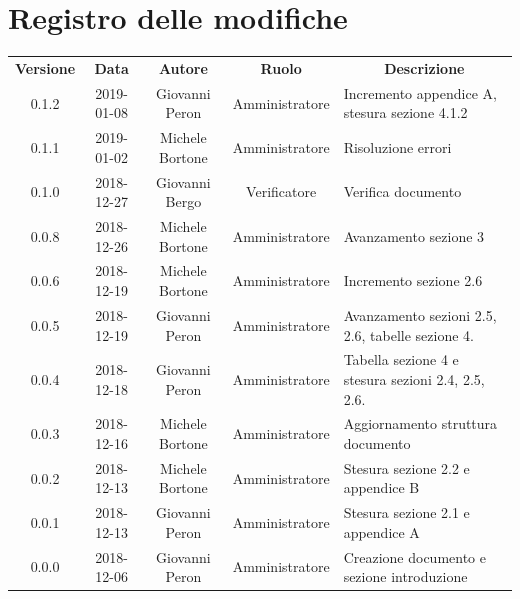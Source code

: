 \documentclass[11pt,a4paper]{article}
\begin{document}
	
	\newpage
	\section*{\centering Registro delle modifiche}
	\begin{tabularx}{\textwidth}{ c | c | c | c | X }
		\rowcolor{LightBlue}
		\color{white}\bfseries Versione & \color{white}\bfseries Data & \color{white}\bfseries Autore & \color{white}\bfseries Ruolo & \multicolumn{1}{c}{\color{white}\bfseries Descrizione}\\[0.25cm]
		0.1.2 & 2019-01-08 & Giovanni Peron & Amministratore & Incremento appendice A, stesura sezione 4.1.2\\ \hline
		0.1.1 & 2019-01-02 & Michele Bortone & Amministratore & Risoluzione errori\\ \hline
		0.1.0 & 2018-12-27 & Giovanni Bergo & Verificatore & Verifica documento\\ \hline
		0.0.8 & 2018-12-26 & Michele Bortone & Amministratore & Avanzamento sezione 3\\ \hline
		0.0.6 & 2018-12-19 & Michele Bortone & Amministratore & Incremento sezione 2.6\\ \hline
		0.0.5 & 2018-12-19 & Giovanni Peron & Amministratore & Avanzamento sezioni 2.5, 2.6, tabelle sezione 4.\\ \hline
		0.0.4 & 2018-12-18 & Giovanni Peron & Amministratore & Tabella sezione 4 e stesura sezioni 2.4, 2.5, 2.6.\\ \hline
		0.0.3 & 2018-12-16 & Michele Bortone & Amministratore & Aggiornamento struttura documento\\ \hline
		0.0.2 & 2018-12-13 & Michele Bortone & Amministratore & Stesura sezione 2.2  e appendice B\\ \hline
		0.0.1 & 2018-12-13 & Giovanni Peron & Amministratore & Stesura sezione 2.1 e appendice A \\ \hline
		0.0.0 & 2018-12-06 & Giovanni Peron & Amministratore & Creazione documento e \newline sezione introduzione \\ \hline
	
	\end{tabularx}
	\newpage
	\tableofcontents
	
	\listoffigures
	\listoftables
	
	\newpage
		
	\newpage
	
	\newpage
	
	\newpage
	
	\newpage
		
\end{document}
